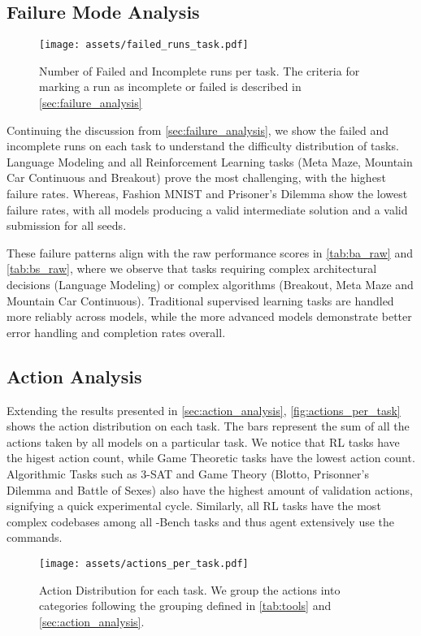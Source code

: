 \subsection{Failure Mode Analysis}
\label{sec:failure_analysis_appendix}
\begin{figure*}[!h]
    \centering
    \texttt{[image: assets/failed\_runs\_task.pdf]}
    \caption{Number of Failed and Incomplete runs per task. The criteria for marking a run as incomplete or failed is described in \autoref{sec:failure_analysis}}
    \label{fig:failed_runs_task}
\end{figure*}

Continuing the discussion from \autoref{sec:failure_analysis}, we show the failed and incomplete runs on each task to understand the difficulty distribution of tasks.
%
Language Modeling and all Reinforcement Learning tasks (Meta Maze, Mountain Car Continuous and Breakout) prove the most challenging, with the highest failure rates.
%
Whereas, Fashion MNIST and Prisoner's Dilemma show the lowest failure rates, with all models producing a valid intermediate solution and a valid submission for all seeds.
%

These failure patterns align with the raw performance scores in \autoref{tab:ba_raw} and \autoref{tab:bs_raw}, where we observe that tasks requiring complex architectural decisions (Language Modeling) or complex algorithms (Breakout, Meta Maze and Mountain Car Continuous). 
%
Traditional supervised learning tasks are handled more reliably across models, while the more advanced models demonstrate better error handling and completion rates overall.
\newpage

\subsection{Action Analysis}
\label{sec:action_analysis_appendix}

Extending the results presented in \autoref{sec:action_analysis}, \autoref{fig:actions_per_task} shows the action distribution on each task. The bars represent the sum of all the actions taken by all models on a particular task.
We notice that RL tasks have the higest action count, while Game Theoretic tasks have the lowest action count. 
Algorithmic Tasks such as 3-SAT and Game Theory (Blotto, Prisonner's Dilemma and Battle of Sexes) also have the highest amount of validation actions, signifying a quick experimental cycle.
Similarly, all RL tasks have the most complex codebases among all \mlgym-Bench tasks and thus agent extensively use the \viewer commands.
\begin{figure*}[!h]
    \centering
    \texttt{[image: assets/actions\_per\_task.pdf]}
    \caption{Action Distribution for each task. We group the actions into categories following the grouping defined in \autoref{tab:tools} and \autoref{sec:action_analysis}.}
    \label{fig:actions_per_task}
\end{figure*}

